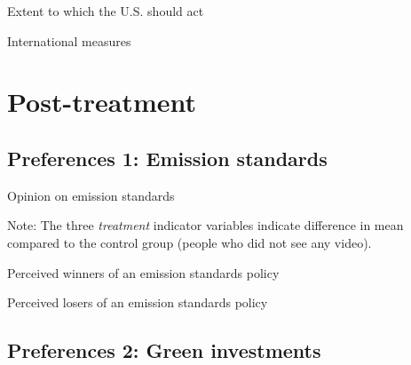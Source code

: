 \documentclass{article}
\begin{document}
\begin{table}[h!]
	\caption{Extent to which the U.S. should act}
	\begin{center}
		\scalebox{0.7}{}
	\end{center}
\end{table}	

\begin{landscape}
	\begin{table}[h!]
	\caption{International measures}
	\begin{center}
		\scalebox{0.6}{}
	\end{center}
\end{table}	
\end{landscape}


\clearpage
\section{Post-treatment}
\subsection{Preferences 1: Emission standards}

\begin{table}[h!]
	\caption{Opinion on emission standards}
	\begin{center}
		\scalebox{0.7}{}
	\end{center}
	{\footnotesize Note: The three \textit{treatment} indicator variables indicate difference in mean compared to the control group (people who did not see any video).}
\end{table}	

\begin{table}[h!]
	\caption{Perceived winners of an emission standards policy}
	\begin{center}
		\scalebox{0.7}{}
	\end{center}
\end{table}	

\begin{table}[h!]
	\caption{Perceived losers of an emission standards policy}
	\begin{center}
		\scalebox{0.7}{}
	\end{center}
\end{table}	

\clearpage
\subsection{Preferences 2: Green investments}
\end{document}
